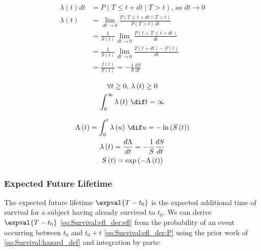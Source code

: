 \begin{subequations}\label{eq:Survival:hazard_def}
\begin{align}
\lambda\left(t\right) dt &= P\left(T \leq t + dt \mid T > t\right),\,\text{as} \,\, dt \to 0 \label{eq:Survival:hazard_def:a} \\
\lambda\left(t\right) &= \lim_{dt \to 0} \frac{P\left(T \leq t + dt \cap T > t\right)}{P\left(T > t\right)\,dt} \label{eq:Survival:hazard_def:b} \\
&= \frac{1}{S\left(t\right)} \lim_{dt \to 0} \frac{P\left(t < T \leq t + dt\right)}{dt} \label{eq:Survival:hazard_def:c} \\
&= \frac{1}{S\left(t\right)} \lim_{dt \to 0} \frac{F\left(t + dt\right) - F\left(t\right)}{dt} \label{eq:Survival:hazard_def:d} \\
&= \frac{f\left(t\right)}{S\left(t\right)} = -\frac{1}{S} \frac{dS}{dt} \label{eq:Survival:hazard_def:e}
\end{align}
\end{subequations}

\begin{subequations}\label{eq:Survival:hazard_cond}
\begin{gather}
\forall t \geq 0, \, \lambda\left(t\right) \geq 0 \label{eq:Survival:hazard_cond:a} \\
\int_{0}^{\infty} \lambda\left(t\right) \, \dif t = \infty \label{eq:Survival:hazard_cond:b}
\end{gather}
\end{subequations}

\begin{subequations}\label{eq:Survival:cum_hazard}
\begin{gather}
\Lambda\left(t\right) = \int_{0}^{t} \lambda\left(u\right) \, \dif u = - \ln\left(S\left(t\right)\right) \label{eq:Survival:cum_hazard:def} \\
\lambda\left(t\right) = \frac{d\Lambda}{dt} = -\frac{1}{S} \frac{dS}{dt} \label{eq:Survival:cum_hazard:to_lambda} \\
S\left(t\right) = \exp\left(-\Lambda\left(t\right)\right) \label{eq:Survival:cum_hazard:to_S}
\end{gather}
\end{subequations}

\subsubsection{Expected Future Lifetime}
\label{additional:Survival:Nomenclature:efl}
The expected future lifetime $\expval{T-t_{0}}$ is the
expected additional time of survival for a subject having already survived to $t_{0}$.
We can derive $\expval{T-t_{0}}$ \cref{eq:Survival:efl_der:efl}
from the probability of an event occurring between $t_{0}$ and $t_{0} + t$ \cref{eq:Survival:efl_der:P}
using the prior work of \cref{eq:Survival:hazard_def} and integration by parts:

